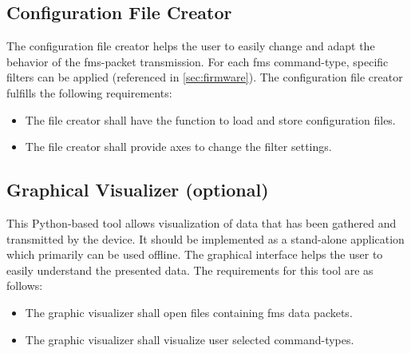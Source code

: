 \subsection{Configuration File Creator}
The configuration file creator helps the user to easily change and adapt the behavior of the \acrshort{fms}-packet transmission. For each \acrshort{fms} command-type, specific filters can be applied (referenced in \cref{sec:firmware}). The configuration file creator fulfills the following requirements:
\begin{itemize}
        \item The file creator shall have the function to load and store configuration files.
        \item The file creator shall provide axes to change the filter settings.
\end{itemize}


\subsection{Graphical Visualizer (optional)}
This Python-based tool allows visualization of data that has been gathered and transmitted by the device.
It should be implemented as a stand-alone application which primarily can be used offline.
The graphical interface helps the user to easily understand the presented data.
The requirements for this tool are as follows:
\begin{itemize}
        \item The graphic visualizer shall open files containing \acrshort{fms} data packets.
        \item The graphic visualizer shall visualize user selected command-types.
\end{itemize}
